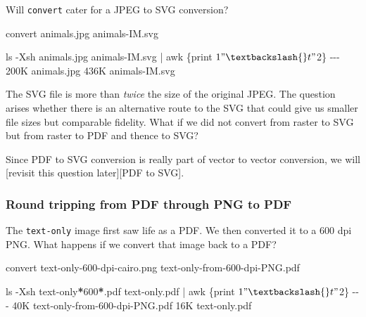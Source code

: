 \documentclass[
  11pt,
  british,
  a4paper,
]{article}
\newenvironment{Shaded}{\begin{snugshade}}{\end{snugshade}}
\newcommand{\AttributeTok}[1]{\textcolor[rgb]{0.80,0.80,0.80}{#1}}
\newcommand{\ExtensionTok}[1]{\textcolor[rgb]{0.80,0.80,0.80}{#1}}
\newcommand{\FunctionTok}[1]{\textcolor[rgb]{0.94,0.94,0.56}{#1}}
\newcommand{\KeywordTok}[1]{\textcolor[rgb]{0.94,0.87,0.69}{#1}}
\newcommand{\NormalTok}[1]{\textcolor[rgb]{0.80,0.80,0.80}{#1}}
\newcommand{\PreprocessorTok}[1]{\textcolor[rgb]{1.00,0.81,0.69}{\textbf{#1}}}
\newcommand{\StringTok}[1]{\textcolor[rgb]{0.80,0.58,0.58}{#1}}
\begin{document}
Will \texttt{convert} cater for a JPEG to SVG conversion?

\begin{Shaded}
\begin{Highlighting}[]
\ExtensionTok{convert}\NormalTok{ animals.jpg animals{-}IM.svg}

\FunctionTok{ls} \AttributeTok{{-}Xsh}\NormalTok{ animals.jpg animals{-}IM.svg }\KeywordTok{|} \FunctionTok{awk} \StringTok{\textquotesingle{}\{print $1 "\textbackslash{}t" $2\}\textquotesingle{}}
\ExtensionTok{{-}{-}{-}}
\ExtensionTok{200K}\NormalTok{    animals.jpg}
\ExtensionTok{436K}\NormalTok{    animals{-}IM.svg}
\end{Highlighting}
\end{Shaded}

The SVG file is more than \emph{twice} the size of the original JPEG.
The question arises whether there is an alternative route to the SVG
that could give us smaller file sizes but comparable fidelity. What if
we did not convert from raster to SVG but from raster to PDF and thence
to SVG?

Since PDF to SVG conversion is really part of vector to vector
conversion, we will {[}revisit this question later{]}{[}PDF to SVG{]}.

\hypertarget{round-tripping-from-pdf-through-png-to-pdf}{%
\subsubsection{Round tripping from PDF through PNG to
PDF}\label{round-tripping-from-pdf-through-png-to-pdf}}

The \texttt{text-only} image first saw life as a PDF. We then converted
it to a 600 dpi PNG. What happens if we convert that image back to a
PDF?

\begin{Shaded}
\begin{Highlighting}[]
\ExtensionTok{convert}\NormalTok{ text{-}only{-}600{-}dpi{-}cairo.png text{-}only{-}from{-}600{-}dpi{-}PNG.pdf}

\FunctionTok{ls} \AttributeTok{{-}Xsh}\NormalTok{ text{-}only}\PreprocessorTok{*}\NormalTok{600}\PreprocessorTok{*}\NormalTok{.pdf text{-}only.pdf }\KeywordTok{|} \FunctionTok{awk} \StringTok{\textquotesingle{}\{print $1 "\textbackslash{}t" $2\}\textquotesingle{}}
\ExtensionTok{{-}{-}{-}}
\ExtensionTok{40K}\NormalTok{     text{-}only{-}from{-}600{-}dpi{-}PNG.pdf}
\ExtensionTok{16K}\NormalTok{     text{-}only.pdf}
\end{Highlighting}
\end{Shaded}
\end{document}
